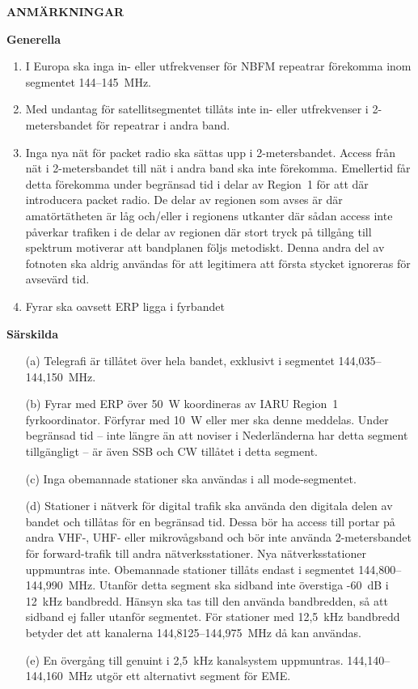 \textbf{ANMÄRKNINGAR}

\textbf{Generella}
\begin{enumerate}[label=\alph*.]
\item I Europa ska inga in- eller utfrekvenser för NBFM repeatrar
  förekomma inom segmentet 144--145~MHz.
\item Med undantag för satellitsegmentet tillåts inte in- eller
  utfrekvenser i 2-metersbandet för repeatrar i andra band.
\item Inga nya nät för packet radio ska sättas upp i 2-metersbandet.
  Access från nät i 2-metersbandet till nät i andra band ska inte förekomma.
  Emellertid får detta förekomma under begränsad tid i delar av Region~1
  för att där introducera packet radio.
  De delar av regionen som avses är där amatörtätheten är låg och/eller
  i regionens utkanter där sådan access inte påverkar trafiken i de delar
  av regionen där stort tryck på tillgång till spektrum motiverar att
  bandplanen följs metodiskt.
  Denna andra del av fotnoten ska aldrig användas för att legitimera
  att första stycket ignoreras för avsevärd tid.
\item Fyrar ska oavsett ERP ligga i fyrbandet
\end{enumerate}

\textbf{Särskilda}
\begin{itemize}
\item[(a)] Telegrafi är tillåtet över hela bandet, exklusivt i segmentet
  144,035--144,150~MHz.

\item[(b)] Fyrar med ERP över 50~W koordineras av IARU Region~1 fyrkoordinator.
  Förfyrar med 10~W eller mer ska denne meddelas. Under begränsad tid -- inte
  längre än att noviser i Nederländerna har detta segment tillgängligt -- är
  även SSB och CW tillåtet i detta segment.

\item[(c)] Inga obemannade stationer ska användas i all mode-segmentet.

\item[(d)] Stationer i nätverk för digital trafik ska använda den
digitala delen av bandet och tillåtas för en begränsad tid.
Dessa bör ha access till portar på andra VHF-, UHF- eller mikrovågsband och bör
inte använda 2-metersbandet för forward-trafik till andra nätverksstationer.
Nya nätverksstationer uppmuntras inte.
Obemannade stationer tillåts endast i segmentet 144,800--144,990~MHz.
Utanför detta segment ska sidband inte överstiga -60~dB i 12~kHz bandbredd.
Hänsyn ska tas till den använda bandbredden, så att sidband ej faller
utanför segmentet.
För stationer med 12,5~kHz bandbredd betyder det att kanalerna
144,8125--144,975~MHz då kan användas.

\item[(e)] En övergång till genuint i 2,5~kHz kanalsystem uppmuntras.
144,140--144,160~MHz utgör ett alternativt segment för EME.
\end{itemize}

